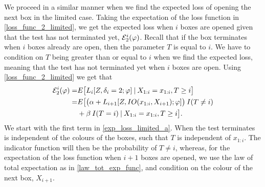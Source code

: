 We proceed in a similar manner when we find the expected loss of opening the next box in the limited case. Taking the expectation of the loss function in \eqref{loss_func_2_limited}, we get the expected loss when $i$ boxes are opened given that the test has not terminated yet, $\mathcal{E}^i_2(\varphi)$. Recall that if the box terminates when $i$ boxes already are open, then the parameter $T$ is equal to $i$. We have to condition on $T$ being greater than or equal to $i$ when we find the expected loss, meaning that the test has not terminated yet when $i$ boxes are open. Using \eqref{loss_func_2_limited} we get that
\begin{equation}
\label{exp_loss_limited_a}
    \begin{aligned}
        \mathcal{E}^i_{2}(\varphi) 
        = &E\big[L_i[Z,\delta_i=2;\varphi]\: | \: X_{1:i}=x_{1:i}, T\geq i\big] \\
        =& E\big[\big( \alpha + L_{i+1}[Z,IO(x_{1:i},X_{i+1});\varphi] \big) \: I(T\neq i) \\
        &+ \beta \: I(T=i) \: | \: X_{1:i}= x_{1:i}, T\geq i\big].
    \end{aligned}
\end{equation}
We start with the first term in \eqref{exp_loss_limited_a}. When the test terminates is independent of the colours of the boxes, such that $T$ is independent of $x_{1:i}$. The indicator function will then be the probability of $T\neq i$, whereas, for the expectation of the loss function when $i+1$ boxes are opened, we use the law of total expectation as in \eqref{law_tot_exp_func}, and condition on the colour of the next box, $X_{i+1}$. 

